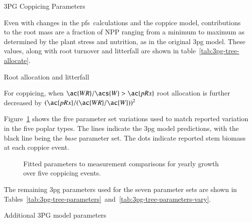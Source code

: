 \documentclass[preprint,12pt]{elsarticle}
\begin{document}
\begin{table}%
\caption{3PG Coppicing Parameters}

\label{tab:3pg-tree-coppice}
 \end{table}

 Even with changes in the \ac{pfs}~calculations and the coppice model,
 contributions to the root mass are a fraction of \ac{NPP} ranging
 from a minimum to maximum as determined by the plant stress and
 nutrition, as in the original \ac{3pg} model.  These values, along
 with root turnover and litterfall are shown in
 table~\ref{tab:3pg-tree-allocate}.  

\begin{table}%
\caption{Root allocation and litterfall}

  \begin{flushleft}For coppicing, when $\ac{WR}/\acs{W}>\ac{pRx}$ root allocation is further 
decreased by $(\ac{pRx}/(\ac{WR}/\ac{W}))^2$
\end{flushleft}  
\label{tab:3pg-tree-allocate}
\end{table}

Figure~\ref{fig:pont-best} shows the five parameter set variations
used to match reported variation in the five poplar types.  The lines
indicate the \ac{3pg} model predictions, with the black line being the
\emph{base} parameter set.  The dots indicate reported stem biomass at
each coppice event.

\begin{figure}%
  \centering
  
  \caption{Fitted parameters to measurement comparisons for yearly growth
      over five coppicing events.}
\label{fig:pont-best}
\end{figure}

The remaining \ac{3pg} parameters used for the seven parameter sets are shown in 
Tables~\ref{tab:3pg-tree-parameters}~and~\ref{tab:3pg-tree-parameters-vary}. 

\begin{table}%
\caption{Additional 3PG model parameters}

\label{tab:3pg-tree-parameters}
 \end{table}
\end{document}
